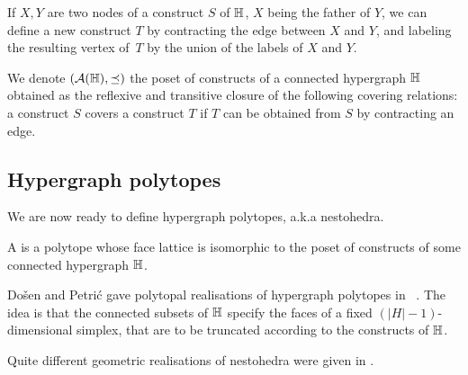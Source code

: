If $X,Y$ are two nodes of a construct $S$ of ${\mathbb H}$, $X$ being the father of $Y$, we can define a new construct $T$ by contracting the edge between $X$ and $Y$, and labeling the resulting vertex of~$T$ by the union of the labels of $X$ and $Y$. 

\begin{definition}
    We denote $({\cal A}({\mathbb H}),\preceq)$ the poset of constructs of a connected hypergraph ${\mathbb H}$ obtained as the reflexive and transitive closure of the following covering relations: a construct $S$ covers a construct $T$ if $T$ can be obtained from $S$ by contracting an edge.
\end{definition}


\subsection{Hypergraph polytopes}

We are now ready to define hypergraph polytopes, a.k.a nestohedra.

\begin{definition}
    A  is a polytope whose face lattice is isomorphic to the poset of constructs of some connected hypergraph ${\mathbb H}$.
\end{definition}

Do\v sen and Petri\'c gave polytopal realisations of hypergraph polytopes in ~\cite{DP-HP}.
The idea is that the connected subsets of ${\mathbb H}$ specify the faces of a fixed $(|H|-1)$-dimensional simplex, that are to be truncated according to the constructs of ${\mathbb H}$.

\begin{rem}
    Quite different geometric realisations of nestohedra were given in \cite{P09}. 
\end{rem}

